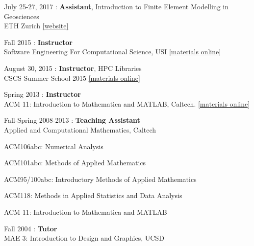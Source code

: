 \begin{samepage}
\noindent July 25-27, 2017 : \textbf{Assistant}, Introduction to Finite Element Modelling in Geosciences \\
ETH Zurich
\href{http://jupiter.ethz.ch/~gfdteaching/femblockcourse/2016/}{[website]}\\
\end{samepage}

\begin{samepage}
\noindent Fall 2015 : \textbf{Instructor} \\
Software Engineering For Computational Science, USI
\href{https://bitbucket.org/psanan/sefcs2015}{[materials online]}\\
\end{samepage}

\begin{samepage}
\noindent August 30, 2015 : \textbf{Instructor}, HPC Libraries \\
CSCS Summer School 2015
\href{https://github.com/eth-cscs/SummerSchool2015/tree/master/libraries}{[materials online]}\\
\end{samepage}

\begin{samepage}
\noindent Spring 2013 : \textbf{Instructor}\\
ACM 11: Introduction to Mathematica and MATLAB, Caltech.
\href{https://bitbucket.org/psanan/introduction-to-matlab-and-mathematica}{[materials online]}\\
\end{samepage}

\begin{samepage}
\noindent Fall-Spring 2008-2013 : \textbf{Teaching Assistant}\\
Applied and Computational Mathematics, Caltech
\vspace{-8pt}
\begin{tightitemize}
\item ACM106abc: Numerical Analysis
\item ACM101abc: Methods of Applied Mathematics
\item ACM95/100abc: Introductory Methods of Applied Mathematics
\item ACM118: Methods in Applied Statistics and Data Analysis
\item ACM 11: Introduction to Mathematica and MATLAB
\end{tightitemize}
\end{samepage}

\begin{samepage}
\noindent Fall 2004 : \textbf{Tutor}\\
MAE 3: Introduction to Design and Graphics, UCSD
\end{samepage}
